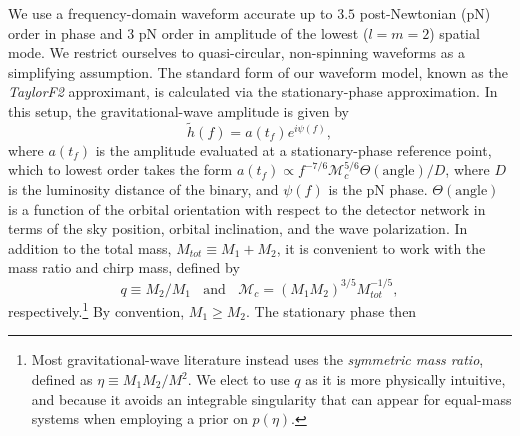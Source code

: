 \documentclass[11pt,a4paper]{emulateapj} 
\newcommand{\will}[1]{{\color{cyan} #1}}
\newcommand{\chmass}{\mathcal{M}_c}
\begin{document}
We use a frequency-domain waveform accurate up to $3.5$ post-Newtonian
(pN) order in phase and 3 pN order in amplitude of the lowest ($l=m=2$) spatial mode.
  We restrict
ourselves to quasi-circular, non-spinning waveforms as a simplifying
assumption.  The standard form of our waveform model, known as the
\textit{TaylorF2} approximant, is calculated via the stationary-phase
approximation.  In this setup, the gravitational-wave amplitude is
given by
\begin{equation}
\tilde{h}(f) = a(t_f) e^{i \psi(f)},
\label{amplitude}
\end{equation}
where $a(t_f)$ is the amplitude evaluated at a stationary-phase
reference point, which to lowest order takes the form $a(t_f) \propto
f^{-7/6} \chmass^{5/6}\Theta(\text{angle})/D$, where $D$ is the
luminosity distance of the binary, and $\psi(f)$ is the pN phase.
$\Theta(\text{angle})$ is a function of the orbital orientation with
respect to the detector network in terms of the sky position, orbital
inclination, and the wave polarization.  In addition to the total
mass, $M_{tot}\equiv M_1+M_2$, it is convenient to work with the mass
ratio and chirp mass, defined by
\begin{equation}
  q\equiv M_2/M_1~~~~\text{and}~~~~\chmass = (M_1 M_2)^{3/5}
  M_{tot}^{-1/5},
  \label{eqRatioCM}
\end{equation}
respectively.\footnote{Most gravitational-wave literature instead uses
  the \textit{symmetric mass ratio}, defined as $\eta \equiv M_1 M_2 /
  M^2$.  We elect to use $q$ as it is more physically intuitive, and
  because it avoids an integrable singularity that can appear for
  equal-mass systems when employing a prior on $p(\eta)$.  
    }  By convention, $M_1 \geq M_2$.  The stationary phase then
\end{document}
